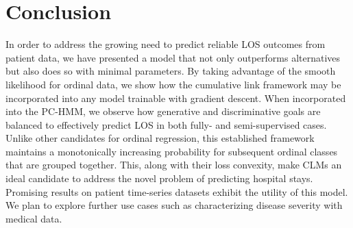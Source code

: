 \section{Conclusion}
In order to address the growing need to predict reliable LOS outcomes from patient data, we have presented a model that not only outperforms alternatives but also does so with minimal parameters. By taking advantage of the smooth likelihood for ordinal data, we show how the cumulative link framework may be incorporated into any model trainable with gradient descent. When incorporated into the PC-HMM, we observe how generative and discriminative goals are balanced to effectively predict LOS in both fully- and semi-supervised cases. Unlike other candidates for ordinal regression, this established framework maintains a monotonically increasing probability for subsequent ordinal classes that are grouped together. This, along with their loss convexity, make CLMs an ideal candidate to address the novel problem of predicting hospital stays. Promising results on patient time-series datasets exhibit the utility of this model. We plan to explore further use cases such as characterizing disease severity with medical data.